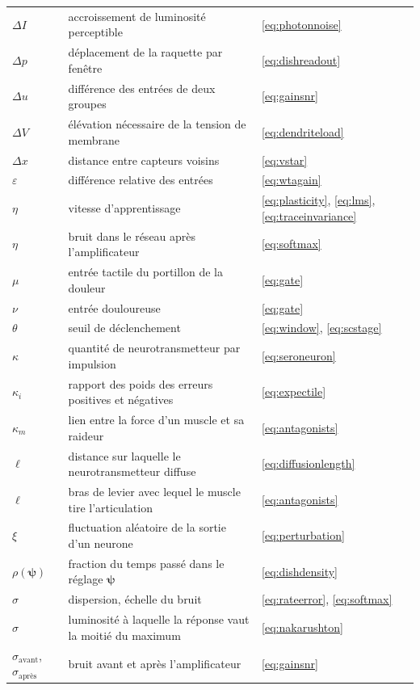 \begin{center}
\begin{longtable}{>{\raggedright}p{2.0cm}>{\raggedright}p{9.6cm}>{\raggedright\arraybackslash}p{2.4cm}}
$\Delta I$ & accroissement de luminosité perceptible & \eqref{eq:photonnoise} \\
$\Delta p$ & déplacement de la raquette par fenêtre & \eqref{eq:dishreadout} \\
$\Delta u$ & différence des entrées de deux groupes & \eqref{eq:gainsnr} \\
$\Delta V$ & élévation nécessaire de la tension de membrane & \eqref{eq:dendriteload} \\
$\Delta x$ & distance entre capteurs voisins & \eqref{eq:vstar} \\
$\varepsilon$ & différence relative des entrées & \eqref{eq:wtagain} \\
$\eta$ & vitesse d'apprentissage & \eqref{eq:plasticity}, \eqref{eq:lms}, \eqref{eq:traceinvariance} \\
$\eta$ & bruit dans le réseau après l'amplificateur & \eqref{eq:softmax} \\
$\mu$ & entrée tactile du portillon de la douleur & \eqref{eq:gate} \\
$\nu$ & entrée douloureuse & \eqref{eq:gate} \\
$\theta$ & seuil de déclenchement & \eqref{eq:window}, \eqref{eq:scstage} \\
$\kappa$ & quantité de neurotransmetteur par impulsion & \eqref{eq:seroneuron} \\
$\kappa_i$ & rapport des poids des erreurs positives et négatives & \eqref{eq:expectile} \\
$\kappa_m$ & lien entre la force d'un muscle et sa raideur & \eqref{eq:antagonists} \\
$\ell$ & distance sur laquelle le neurotransmetteur diffuse & \eqref{eq:diffusionlength} \\
$\ell$ & bras de levier avec lequel le muscle tire l'articulation & \eqref{eq:antagonists} \\
$\xi$ & fluctuation aléatoire de la sortie d'un neurone & \eqref{eq:perturbation} \\
$\rho(\boldsymbol\psi)$ & fraction du temps passé dans le réglage $\boldsymbol\psi$ & \eqref{eq:dishdensity} \\
$\sigma$ & dispersion, échelle du bruit & \eqref{eq:rateerror}, \eqref{eq:softmax} \\
$\sigma$ & luminosité à laquelle la réponse vaut la moitié du maximum & \eqref{eq:nakarushton} \\
$\sigma_{\text{avant}}$, $\sigma_{\text{après}}$ & bruit avant et après l'amplificateur & \eqref{eq:gainsnr} \\

\end{longtable}
\end{center}
